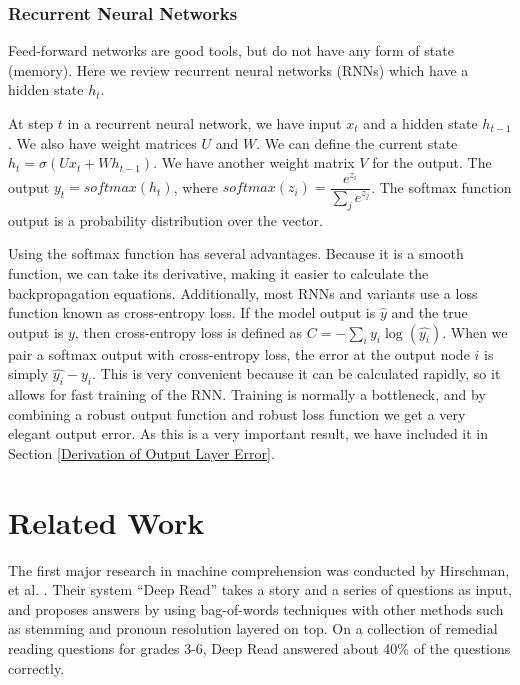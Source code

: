 \documentclass[pageno]{final_paper}
\begin{document}
\subsubsection{Recurrent Neural Networks}
\label{Recurrent Neural Networks}

Feed-forward networks are good tools, but do not have any form of state
(memory). Here we review recurrent neural networks (RNNs) which have a hidden
state $h_t$.

At step $t$ in a recurrent neural network, we have input $x_t$ and a hidden
state $h_{t-1}$. We also have weight matrices $U$ and $W$. We can define the
current state $h_t = \sigma(Ux_t + Wh_{t-1})$. We have another weight matrix $V$
for the output. The output $y_t = softmax(h_t)$, where $softmax(z_i) =
\dfrac{e^{z_i}}{\sum_j e^{z_j}}$. The softmax function output is a probability
distribution over the vector.

Using the softmax function has several advantages. Because it is a smooth
function, we can take its derivative, making it easier to calculate the
backpropagation equations. Additionally, most RNNs and variants use a loss
function known as cross-entropy loss. If the model output is $\hat{y}$ and the
true output is $y$, then cross-entropy loss is defined as $C = -\sum_i y_i
\log(\hat{y_{i}})$. When we pair a softmax output with cross-entropy loss, the
error at the output node $i$ is simply $\hat{y_i} - y_i$. This is very
convenient because it can be calculated rapidly, so it allows for fast training
of the RNN. Training is normally a bottleneck, and by combining a robust output
function and robust loss function we get a very elegant output error. As this is
a very important result, we have included it in Section \ref{Derivation of
Output Layer Error}.

\section{Related Work}
\label{Related Work}

The first major research in machine comprehension was conducted by Hirschman, et
al. \cite{Hirschman1999}. Their system ``Deep Read'' takes a story and a series
of questions as input, and proposes answers by using bag-of-words techniques
with other methods such as stemming and pronoun resolution layered on top. On a
collection of remedial reading questions for grades 3-6, Deep Read answered
about 40\% of the questions correctly.
\end{document}
